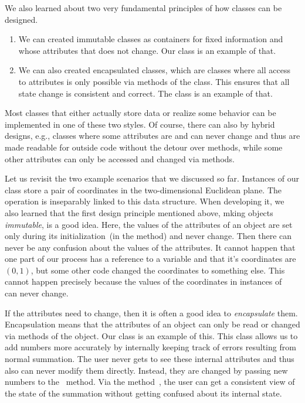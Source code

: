 We also learned about two very fundamental principles of how classes can be designed.%
\begin{enumerate}%
\item We can created immutable classes as containers for fixed information and whose attributes that does not change. %
Our  class is an example of that.%
%
\item We can also created encapsulated classes, which are classes where all access to attributes is only possible via methods of the class. %
This ensures that all state change is consistent and correct. %
The  class is an example of that.%
\end{enumerate}%
%
Most classes that either actually store data or realize some behavior can be implemented in one of these two styles.
Of course, there can also by hybrid designs, e.g., classes where some attributes are  and can never change and thus are made readable for outside code without the detour over methods, while some other attributes can only be accessed and changed via methods.

Let us revisit the two example scenarios that we discussed so far.
Instances of our  class store a pair of coordinates in the two-dimensional Euclidean plane.
The operation  is inseparably linked to this data structure.
When developing it, we also learned that the first design principle mentioned above, mking objects \emph{immutable}, is a good idea.
Here, the values of the attributes of an object are set only during its initialization~(in the  method) and never change.
Then there can never be any confusion about the values of the attributes.
It cannot happen that one part of our process has a reference to a  variable and  that it's coordinates are~$(0,1)$, but some other code changed the coordinates to something else.
This cannot happen precisely because the values of the coordinates in instances of~ can never change.

If the attributes need to change, then it is often a good idea to \emph{encapsulate} them.
Encapsulation means that the attributes of an object can only be read or changed via methods of the object.
Our  class is an example of this.
This class allows us to add numbers more accurately by internally keeping track of errors resulting from normal summation.
The user never gets to see these internal attributes and thus also can never modify them directly.
Instead, they are changed by passing new numbers to the ~method.
Via the method~, the user can get a consistent view of the state of the summation without getting confused about its internal state.


